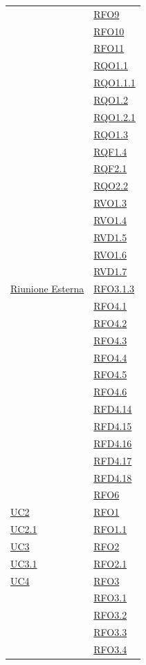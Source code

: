 \begin{itemize}
\begin{itemize}
\begin{itemize}
\begin{itemize}
\begin{longtable}{|>{\centering}m{5cm}|m{5cm}<{\centering}|}
& \hyperlink{RFO9}{RFO9}\\
& \hyperlink{RFO10}{RFO10}\\
& \hyperlink{RFO11}{RFO11}\\
& \hyperlink{RQO1.1}{RQO1.1}\\
& \hyperlink{RQO1.1.1}{RQO1.1.1}\\
& \hyperlink{RQO1.2}{RQO1.2}\\
& \hyperlink{RQO1.2.1}{RQO1.2.1}\\
& \hyperlink{RQO1.3}{RQO1.3}\\
& \hyperlink{RQF1.4}{RQF1.4}\\
& \hyperlink{RQF2.1}{RQF2.1}\\
& \hyperlink{RQO2.2}{RQO2.2}\\
& \hyperlink{RVO1.3}{RVO1.3}\\
& \hyperlink{RVO1.4}{RVO1.4}\\
& \hyperlink{RVD1.5}{RVD1.5}\\
& \hyperlink{RVO1.6}{RVO1.6}\\
& \hyperlink{RVD1.7}{RVD1.7}\\ \hline
\hyperlink{Riunione Esterna}{Riunione Esterna} & \hyperlink{RFO3.1.3}{RFO3.1.3}\\
& \hyperlink{RFO4.1}{RFO4.1}\\
& \hyperlink{RFO4.2}{RFO4.2}\\
& \hyperlink{RFO4.3}{RFO4.3}\\
& \hyperlink{RFO4.4}{RFO4.4}\\
& \hyperlink{RFO4.5}{RFO4.5}\\
& \hyperlink{RFO4.6}{RFO4.6}\\

& \hyperlink{RFD4.14}{RFD4.14}\\
& \hyperlink{RFD4.15}{RFD4.15}\\
& \hyperlink{RFD4.16}{RFD4.16}\\
& \hyperlink{RFD4.17}{RFD4.17}\\
& \hyperlink{RFD4.18}{RFD4.18}\\
& \hyperlink{RFO6}{RFO6}\\ \hline
\hyperref[UC2]{UC2} & \hyperlink{RFO1}{RFO1}\\ \hline
\hyperref[UC2.1]{UC2.1} & \hyperlink{RFO1.1}{RFO1.1}\\ \hline
\hyperref[UC3]{UC3} & \hyperlink{RFO2}{RFO2}\\ \hline
\hyperref[UC3.1]{UC3.1} & \hyperlink{RFO2.1}{RFO2.1}\\ \hline
\hyperref[UC4]{UC4} & \hyperlink{RFO3}{RFO3}\\
& \hyperlink{RFO3.1}{RFO3.1}\\
& \hyperlink{RFO3.2}{RFO3.2}\\
& \hyperlink{RFO3.3}{RFO3.3}\\
& \hyperlink{RFO3.4}{RFO3.4}\\


\end{longtable}
\end{itemize}
\end{itemize}
\end{itemize}
\end{itemize}
